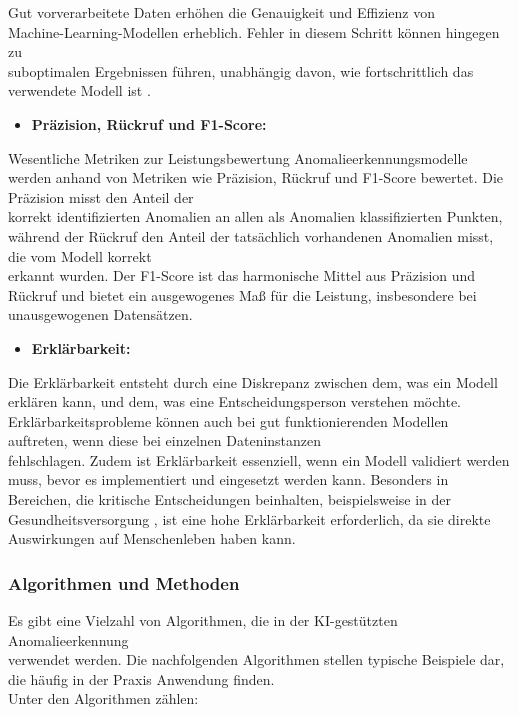 Gut vorverarbeitete Daten erhöhen die Genauigkeit und Effizienz von \\ Machine-Learning-Modellen erheblich. Fehler in diesem Schritt können hingegen zu \\ suboptimalen Ergebnissen führen, unabhängig davon, wie fortschrittlich das verwendete Modell ist\cite{OnlyPreprocessing} \cite{ML}.
\\
\begin{itemize} \item \textbf{Präzision, Rückruf und F1-Score:} \end{itemize} Wesentliche Metriken zur Leistungsbewertung Anomalieerkennungsmodelle werden anhand von Metriken wie Präzision, Rückruf und F1-Score bewertet. Die Präzision misst den Anteil der \\ korrekt identifizierten Anomalien an allen als Anomalien klassifizierten Punkten, während der Rückruf den Anteil der tatsächlich vorhandenen Anomalien misst, die vom Modell korrekt \\ erkannt wurden. Der F1-Score ist das harmonische Mittel aus Präzision und Rückruf und bietet ein ausgewogenes Maß für die Leistung, insbesondere bei unausgewogenen Datensätzen\cite{ROC}. 
\newpage
\begin{itemize} \item \textbf{Erklärbarkeit:} \end{itemize} Die Erklärbarkeit entsteht durch eine Diskrepanz zwischen dem, was ein Modell erklären kann, und dem, was eine Entscheidungsperson verstehen möchte.
Erklärbarkeitsprobleme können auch bei gut funktionierenden Modellen auftreten, wenn diese bei einzelnen Dateninstanzen \\ fehlschlagen. Zudem ist Erklärbarkeit essenziell, wenn ein Modell validiert werden muss, bevor es implementiert und eingesetzt werden kann. Besonders in Bereichen, die kritische Entscheidungen beinhalten, beispielsweise in der Gesundheitsversorgung , ist eine hohe Erklärbarkeit erforderlich, da sie direkte Auswirkungen auf Menschenleben haben kann\cite{explainability}.

\subsubsection*{Algorithmen und Methoden}

Es gibt eine Vielzahl von Algorithmen, die in der KI-gestützten Anomalieerkennung \\ verwendet werden. Die nachfolgenden Algorithmen stellen typische Beispiele dar, die häufig in der Praxis Anwendung finden.  \\ Unter den Algorithmen zählen: \\

